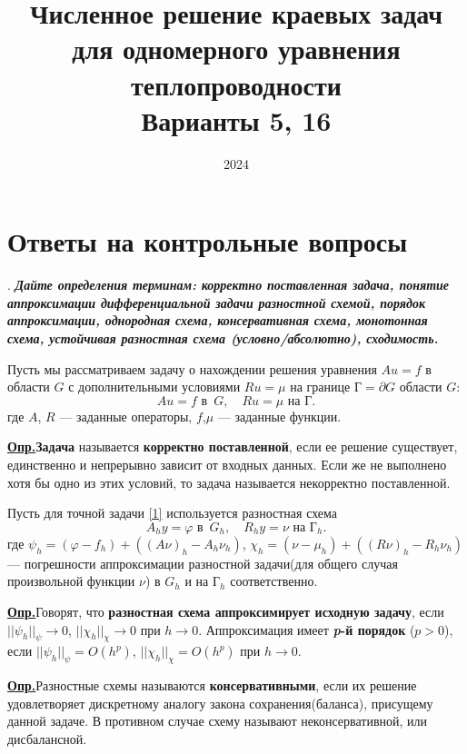 \documentclass[12pt, a4paper]{article}
\title{Численное решение краевых задач для одномерного уравнения теплопроводности \\ Варианты 5, 16}
\date{2024}
\newcommand{\opr}{\textbf{\underline{{Опр.}}}\quad}
\renewcommand{\phi}{\varphi}
\newcounter{mycounter}
\newcommand{\quastion}[1]{%
	\stepcounter{mycounter}%
	\textbf{\themycounter}.  %
	\textbf{\textit{#1}}
	
}
\newcommand{\rusg}{\text{Г}}
\begin{document}
	\maketitle
	\section{Ответы на контрольные вопросы}
	
	\quastion{Дайте определения терминам: корректно поставленная задача, понятие аппроксимации дифференциальной задачи разностной схемой, порядок аппроксимации, однородная схема, консервативная схема, монотонная схема, устойчивая разностная схема (условно/абсолютно), сходимость.}
	
	Пусть мы рассматриваем задачу о нахождении решения уравнения $Au = f$ в области $G$ с дополнительными условиями $Ru = \mu$ на границе $\rusg = \partial G$ области $G$:
	\begin{equation}
		Au = f   \text{ в } \, G, \quad Ru = \mu \text{ на } \rusg.
		\label{1}
	\end{equation}
	где $A$, $R$ --- заданные операторы, $f$,$\mu$ --- заданные функции.
	
	\opr \textbf{Задача} называется \textbf{корректно поставленной}, если ее решение существует, единственно и непрерывно зависит от входных данных. Если же не выполнено хотя бы одно из этих условий, то задача называется некорректно поставленной.
	
	
	Пусть для точной задачи \eqref{1} используется разностная схема
	\begin{equation}
		A_h y = \phi   \text{ в } \, G_h, \quad R_h y = \nu \text{ на } \rusg_h.
		\label{2}
	\end{equation}
	где $\psi_h = (\phi - f_h) + ((A \nu)_h - A_h \nu_h)$, \quad $\chi_h = (\nu - \mu_h) + ((R \nu)_h - R_h \nu_h)$ --- погрешности аппроксимации разностной задачи(для общего случая произвольной функции $\nu$) в $G_h$ и на $\rusg_h$ соответственно.
	
	
	
	
	\opr Говорят, что \textbf{разностная схема аппроксимирует исходную задачу}, если $ ||\psi_h||_\psi \to 0$, $ ||\chi_h||_\chi \to 0$ при $h \to 0$. Аппроксимация имеет \textbf{\textit{p}-й порядок} ($p > 0$), если $ ||\psi_h||_\psi = O(h^p)$, $ ||\chi_h||_\chi = O(h^p)$  при $h \to 0$.
	
	\opr Разностные схемы называются \textbf{консервативными}, если их решение удовлетворяет дискретному аналогу закона сохранения(баланса), присущему данной задаче. В противном случае схему называют неконсервативной, или дисбалансной.
	
\end{document}
